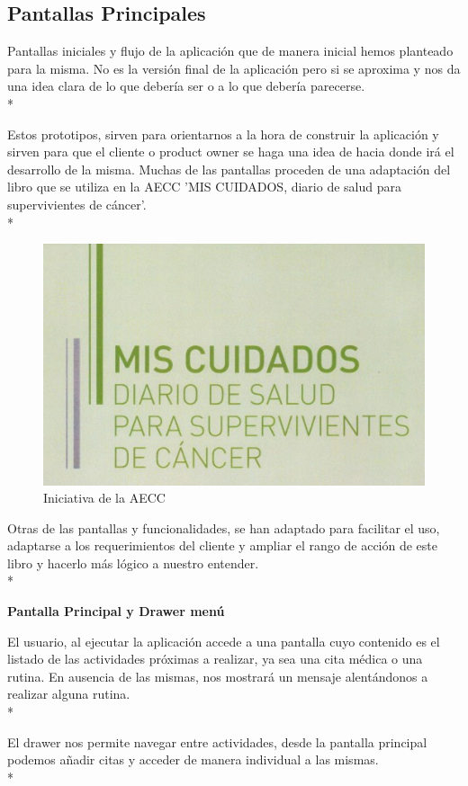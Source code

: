 \documentclass[../pfc.tex]{subfiles}
\begin{document}
		\subsection{Pantallas Principales}
		
		Pantallas iniciales y flujo de la aplicación que de manera inicial hemos planteado para la misma.
		No es la versión final de la aplicación pero si se aproxima y nos da una idea clara de lo que debería ser o a lo que debería parecerse.\\*
		
		Estos prototipos, sirven para orientarnos a la hora de construir la aplicación y sirven para que el cliente o product owner se haga una idea de hacia donde irá el desarrollo de la misma. Muchas de las pantallas proceden de una adaptación del libro que se utiliza en la AECC 'MIS CUIDADOS, diario de salud para supervivientes de cáncer'.\\*
		
		\begin{figure}[H]
			\centering
			\includegraphics[width=0.4\linewidth]{../folleto/001_corto}
			\caption{Iniciativa de la AECC}
			\label{fig:001corto}
		\end{figure}
		
		Otras de las pantallas y funcionalidades, se han adaptado para facilitar el uso, adaptarse a los requerimientos del cliente y ampliar el rango de acción de este libro y hacerlo más lógico a nuestro entender.\\*
		
		
		
		\textbf{Pantalla Principal y Drawer menú}
		
		El usuario, al ejecutar la aplicación accede a una pantalla cuyo contenido es el listado de las actividades próximas a realizar, ya sea una cita médica o una rutina. En ausencia de las mismas, nos mostrará un mensaje alentándonos a realizar alguna rutina.\\*
		
		El drawer nos permite navegar entre actividades, desde la pantalla principal podemos añadir citas y acceder de manera individual a las mismas.\\*
	 
\end{document}
